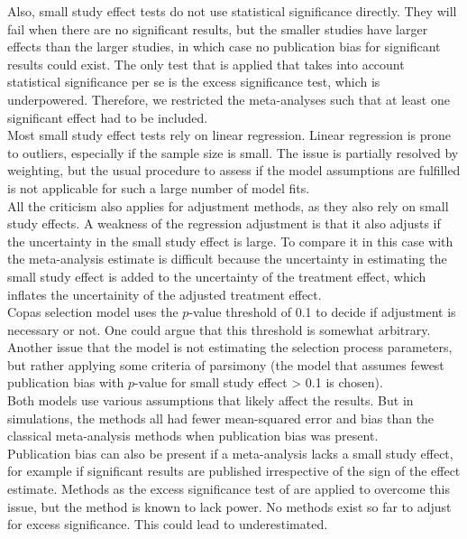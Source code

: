 \documentclass[11pt,a4paper,twoside]{book}\usepackage[]{graphicx}\usepackage[]{color}
\begin{document}
Also, small study effect tests do not use statistical significance directly. They will fail when there are no significant results, but the smaller studies have larger effects than the larger studies, in which case no publication bias for significant results could exist. The only test that is applied that takes into account statistical significance per se is the excess significance test, which is underpowered. Therefore, we restricted the meta-analyses such that at least one significant effect had to be included. \\
Most small study effect tests rely on linear regression. Linear regression is prone to outliers, especially if the sample size is small. The issue is partially resolved by weighting, but the usual procedure to assess if the model assumptions are fulfilled is not applicable for such a large number of model fits.\\
All the criticism also applies for adjustment methods, as they also rely on small study effects. A weakness of the regression adjustment is that it also adjusts if the uncertainty in the small study effect is large. To compare it in this case with the meta-analysis estimate is difficult because the uncertainty in estimating the small study effect is added to the uncertainty of the treatment effect, which inflates the uncertainity of the adjusted treatment effect. \\
Copas selection model uses the $p$-value threshold of 0.1 to decide if adjustment is necessary or not. One could argue that this threshold is somewhat arbitrary. %
Another issue that the model is not estimating the selection process parameters, but rather applying some criteria of parsimony (the model that assumes fewest publication bias with $p$-value for small study effect > 0.1 is chosen). \\
Both models use various assumptions that likely affect the results. But in simulations, the methods all had fewer mean-squared error and bias than the classical meta-analysis methods when publication bias was present.\\
Publication bias can also be present if a meta-analysis lacks a small study effect, for example if significant results are published irrespective of the sign of the effect estimate. Methods as the excess significance test of \citet{excess.significance} are applied to overcome this issue, but the method is known to lack power. No methods exist so far to adjust for excess significance. This could lead to  underestimated.\\
\end{document}
